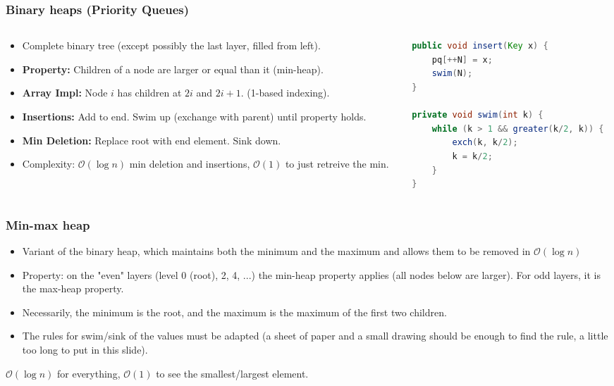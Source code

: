 \documentclass[8pt,aspectratio=169]{beamer}
\begin{document}
\begin{frame}[fragile]
\frametitle{Binary heaps (Priority Queues)}
\begin{columns}[T]
    \begin{column}{0.48\textwidth}
        \begin{itemize}
            \item Complete binary tree (except possibly the last layer, filled from left).
            \item \textbf{Property:} Children of a node are larger or equal than it (min-heap). 
            \item \textbf{Array Impl:} Node $i$ has children at $2i$ and $2i+1$. (1-based indexing).
            \item \textbf{Insertions:} Add to end. Swim up (exchange with parent) until property holds.
            \item \textbf{Min Deletion:} Replace root with end element. Sink down.
            \item Complexity: $\mathcal{O}(\log n)$ min deletion and insertions, $\mathcal{O}(1)$ to just retreive the min.
        \end{itemize}
        \vspace{1em}
    \end{column}

    \begin{column}{0.48\textwidth}
\begin{lstlisting}[language=Java, basicstyle=\tiny\ttfamily, keywordstyle=\color{blue}, frame=single]
public void insert(Key x) {
    pq[++N] = x;
    swim(N);
}

private void swim(int k) {
    while (k > 1 && greater(k/2, k)) {
        exch(k, k/2);
        k = k/2;
    }
}
    \end{lstlisting}
    \end{column}
\end{columns}
\end{frame}

\begin{frame}
\frametitle{Min-max heap}
\begin{itemize}
	\item Variant of the binary heap, which maintains both the minimum and the maximum and allows them to be removed in $\mathcal{O}(\log n)$
	\item Property: on the "even" layers (level 0 (root), 2, 4, ...) the min-heap property applies (all nodes below are larger). For odd layers, it is the max-heap property.
	\item Necessarily, the minimum is the root, and the maximum is the maximum of the first two children.
	\item The rules for swim/sink of the values must be adapted (a sheet of paper and a small drawing should be enough to find the rule, a little too long to put in this slide).
\end{itemize}
$\mathcal{O}(\log n)$ for everything, $\mathcal{O}(1)$ to see the smallest/largest element.
\end{frame}
\end{document}
